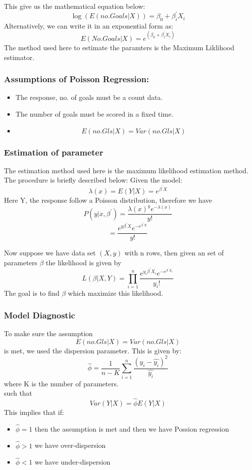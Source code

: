 \documentclass[11pt]{beamer}
\begin{document}
\begin{frame}
     This give us the mathematical equation below:
	\[\log(E(no.Goals|X))= \beta_0+\beta^{'}_{i}X_{i}\]
	Alternatively, we can write it in an exponential form as:
	\[E(No.Goals|X)= e^{(\beta_0+\beta^{'}_{i}X_{i})}\]
	The method used here to estimate the paramters is the Maximum Liklihood estimator.	
	
\end{frame}

\begin{frame}
	\frametitle{Assumptions of Poisson Regression:}
	\begin{itemize}
        \item The response, no. of goals must be a count data.
		\item The number of goals must be scored in a fixed time.
		\item \[E(no.Gls|X) =Var(no.Gls|X)\]
	\end{itemize}
\end{frame}
\begin{frame}
	\frametitle{Estimation of parameter}
	The estimation method used here is the maximum likelihood estimation method.
	The procedure is briefly described below:
	Given the model:
	\[\lambda(x)= E(Y|X)= e^{\beta^{'}X}\]
	Here Y, the response follow a Poisson distribution, therefore we have
	\[P(y|x,\beta^{'})= \frac{\lambda(x)^y e^{-\lambda(x)}}{y!}\]   \[= \frac{e^{y \beta^{'}X} e^{-e^{\beta^{'}X}}}{y!}\]
	
	Now suppose we have  data set $(X,y)$ with n rows, then given an set of parameters $\beta$ the likelihood is given by
	\[L(\beta|X,Y)= \prod_{i=1}^{n} \frac{e^{y_i \beta^{'}X_i} e^{-e^{\beta^{'}X_i}}}{y_i!}\]
	The goal is to find $\beta$ which maximize this likelihood.
\end{frame}
\begin{frame}
    \frametitle{Model Diagnostic}
    To make sure the assumption \[E(no.Gls|X) =Var(no.Gls|X)\] is met, we used the dispersion parameter.
    This is given by:
    \[\hat{\phi}=\frac{1}{n-K}\sum_{i=1}^{n}\frac{(y_i-\hat{y_i})^2}{\hat{y_i}}\]
	where K is the number of parameters.\\
	such that
	\[Var(Y|X)=\hat{\phi}E(Y|X) \]
 This implies that if: 
 \begin{itemize}
	 \item $\hat{\phi}=1$ then the assumption is met and then we have Possion regression\\
	 \item $\hat{\phi}>1$ we have over-dispersion\\
	 \item $\hat{\phi}<1$ we have under-dispersion
  \end{itemize}

\end{frame}
\end{document}
